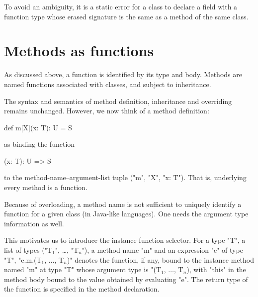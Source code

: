 To avoid an ambiguity, it is a static error for a class to declare a
field with a function type whose erased signature is the same as a
method of the same class.

\section{Methods as functions}

As discussed above, a function is identified by its type and body.
Methods are named functions associated with classes, and subject to
inheritance.

The syntax and semantics of method definition, inheritance and
overriding remains unchanged. However, we now think of a method definition:

\begin{grammar}
def m[X](x: T): U = { S }
\end{grammar}

as binding the function

\begin{xten}
[X](x: T): U => { S }
\end{xten}

to the method-name--argument-list tuple (\xcd"m", \xcd"X",
\xcd"x: T").  That is, underlying every method is a function.

\begin{note}
Because of overloading, a method name is not sufficient to
uniquely identify a function for a given class (in Java-like languages).
One needs the argument type information as well.
\end{note}


This motivates us to introduce the instance function selector. For a
type \xcd"T", a list of types
(\xcdmath"T$_1$", \dots,
\xcdmath"T$_n$"), 
a method name
\xcd"m" and an expression \xcd"e" of type \xcd"T",
\xcdmath"e.m.(T$_1$, $\dots$, T$_n$)" denotes the function,
if any, bound to the instance method named \xcd"m" at type
\xcd"T" whose argument
type is
\xcdmath"(T$_1$, $\dots$, T$_n$), with \xcd"this" in the method
body bound to the value obtained
by evaluating \xcd"e". The
return type of the function is specified in the method declaration.

